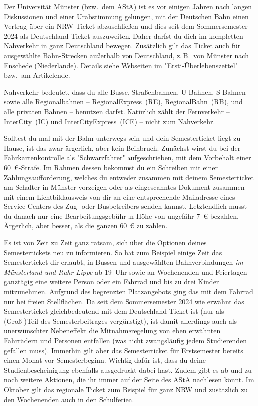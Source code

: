 \begin{multicols*}{2}
Der Universität Münster (bzw.\ dem AStA) ist es vor einigen Jahren nach langen Diskussionen und einer Urabstimmung gelungen, mit der Deutschen Bahn einen Vertrag über ein NRW-Ticket abzuschließen und dies seit dem Sommersemester 2024 als Deutschland-Ticket auszuweiten.
Daher darfst du dich im kompletten Nahverkehr in ganz Deutschland bewegen.
Zusätzlich gilt das Ticket auch für ausgewählte Bahn-Strecken außerhalb von Deutschland, z.\,B.\ von Münster nach Enschede (Niederlande). Details siehe Webseiten im "Ersti-Überlebenszettel" bzw.\ am Artikelende.

Nahverkehr bedeutet, dass du alle Busse, Straßenbahnen, U-Bahnen, S-Bahnen sowie alle Regionalbahnen -- RegionalExpress~(RE), RegionalBahn~(RB), und alle privaten Bahnen -- benutzen darfst.
Natürlich zählt der Fernverkehr -- InterCity~(IC) und InterCityExpress~(ICE) -- nicht zum Nahverkehr.

Solltest du mal mit der Bahn unterwegs sein und dein Semesterticket liegt zu Hause, ist das zwar ärgerlich, aber kein Beinbruch.
Zunächst wirst du bei der Fahrkartenkontrolle als "Schwarzfahrer" aufgeschrieben, mit dem Vorbehalt einer \SI{60}{\euro}-Strafe.
Im Rahmen dessen bekommst du ein Schreiben mit einer Zahlungsaufforderung, welches du entweder zusammen mit deinem Semesterticket am Schalter in Münster vorzeigen oder als eingescanntes Dokument zusammen mit einem Lichtbildausweis von dir an eine entsprechende Mailadresse eines Service-Centers des Zug- oder Busbetreibers senden kannst.  
Letztendlich musst du danach nur eine Bearbeitungsgebühr in Höhe von ungefähr \SI{7}{\euro} bezahlen. Ärgerlich, aber besser, als die ganzen \SI{60}{\euro} zu zahlen.

Es ist von Zeit zu Zeit ganz ratsam, sich über die Optionen deines Semestertickets neu zu informieren.
So hat zum Beispiel einige Zeit das Semesterticket dir erlaubt, in Bussen und ausgewählten Bahnverbindungen \emph{im Münsterland und Ruhr-Lippe} ab 19~Uhr sowie an Wochenenden und Feiertagen ganztägig eine weitere Person oder ein Fahrrad und bis zu drei Kinder mitzunehmen. Aufgrund des begrenzten Platzangebots ging das mit dem Fahrrad nur bei freien Stellflächen.
Da seit dem Sommersemester 2024 wie erwähnt das Semesterticket gleichbedeutend mit dem Deutschland-Ticket ist (nur als (Groß-)Teil des Semesterbeitrages vergünstigt), ist damit allerdings auch als unerwünschter Nebeneffekt die Mitnahmeregelung von eben erwähnten Fahrrädern und Personen entfallen (was nicht zwangsläufig jedem Studierenden gefallen muss). 
Immerhin gilt aber das Semesterticket für Erstsemester bereits einen Monat vor Semesterbeginn. Wichtig dafür ist, dass du deine Studienbescheinigung ebenfalls ausgedruckt dabei hast. Zudem gibt es ab und zu noch weitere Aktionen, die ihr immer auf der Seite des AStA nachlesen könnt. Im Oktober gilt das regionale Ticket zum Beispiel für ganz NRW und zusätzlich zu den Wochenenden auch in den Schulferien.


\end{multicols*}
